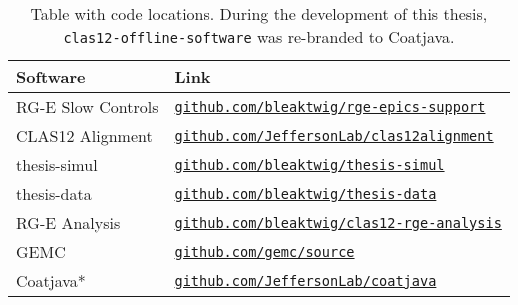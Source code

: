     \begin{table}[b!]
        \begin{center}
            \begin{tabularx}{0.90\textwidth}{ll}
                \toprule
                \textbf{Software}  & \textbf{Link} \\
                \midrule \midrule
                RG-E Slow Controls &
                    \href{https://github.com/bleaktwig/rge-epics-support}
                    {\texttt{github.com/bleaktwig/rge-epics-support}} \\
                \midrule
                CLAS12 Alignment   &
                    \href{https://github.com/JeffersonLab/clas12alignment}
                    {\texttt{github.com/JeffersonLab/clas12alignment}} \\
                \midrule
                thesis-simul       &
                    \href{https://github.com/bleaktwig/thesis-simul}
                    {\texttt{github.com/bleaktwig/thesis-simul}} \\
                thesis-data        &
                    \href{https://github.com/bleaktwig/thesis-data}
                    {\texttt{github.com/bleaktwig/thesis-data}} \\
                RG-E Analysis      &
                    \href{https://github.com/bleaktwig/clas12-rge-analysis}
                    {\texttt{github.com/bleaktwig/clas12-rge-analysis}} \\
                GEMC               &
                    \href{https://github.com/gemc/source}
                    {\texttt{github.com/gemc/source}} \\
                Coatjava*          &
                    \href{https://github.com/JeffersonLab/coatjava}
                    {\texttt{github.com/JeffersonLab/coatjava}} \\
                \bottomrule
            \end{tabularx}
        \end{center}

        \caption{Table with code locations.
        During the development of this thesis, \texttt{clas12-offline-software} was re-branded to Coatjava.}
        \label{tab::20.02::code_locations}
    \end{table}
